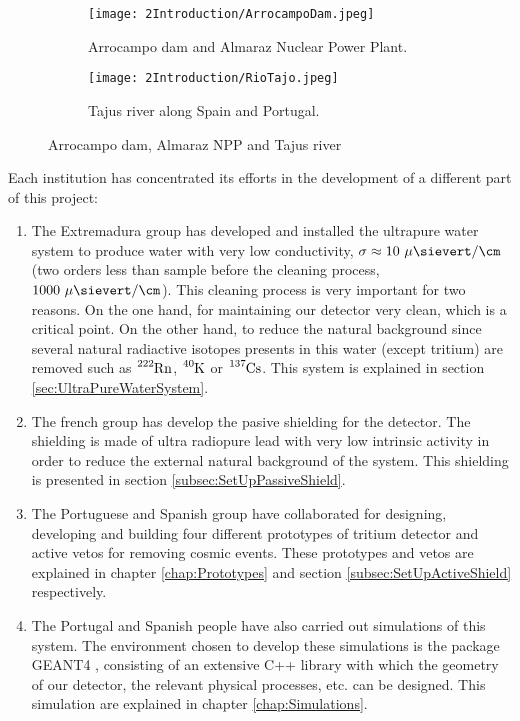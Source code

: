 \begin{figure}
\centering
    \begin{subfigure}[b]{0.45\textwidth}
    \centering
    \texttt{[image: 2Introduction/ArrocampoDam.jpeg]}  
    \caption{Arrocampo dam and Almaraz Nuclear Power Plant.\label{subfig:Arrocampo_Dam}}
    \end{subfigure}
    \hfill
    \begin{subfigure}[b]{0.45\textwidth}
    \centering
    \texttt{[image: 2Introduction/RioTajo.jpeg]}  
    \caption{Tajus river along Spain and Portugal.\label{subfig:TajusRiver}}
    \end{subfigure}
 \caption{Arrocampo dam, Almaraz NPP and Tajus river}
 \label{fig:Arrocampo}
\end{figure}

Each institution has concentrated its efforts in the development of a different part of this project:

\begin{enumerate}
\item{} The Extremadura group has developed and installed the ultrapure water system to produce water with very low conductivity, $\sigma \approx 10~\mu\sievert/\cm$ (two orders less than sample before the cleaning process, $1000~\mu\sievert/\cm$). This cleaning process is very important for two reasons. On the one hand, for maintaining our detector very clean, which is a critical point. On the other hand, to reduce the natural background since several natural radiactive isotopes presents in this water (except tritium) are removed such as $\ce{^{222}Rn}$, $\ce{^{40}K}$ or $\ce{^{137}Cs}$. This system is explained in section \ref{sec:UltraPureWaterSystem}.

\item{} The french group has develop the pasive shielding for the detector. The shielding is made of ultra radiopure lead with very low intrinsic activity in order to reduce the external natural background of the system. This shielding is presented in section \ref{subsec:SetUpPassiveShield}.

\item{} The Portuguese and Spanish group have collaborated for designing, developing and building four different prototypes of tritium detector and active vetos for removing cosmic events. These prototypes and vetos are explained in chapter \ref{chap:Prototypes} and section \ref{subsec:SetUpActiveShield} respectively.

\item{} The Portugal and Spanish people have also carried out simulations of this system. The environment chosen to develop these simulations is the package GEANT4 \cite{Geant4WebPage}, consisting of an extensive C++ library with which the geometry of our detector, the relevant physical processes, etc. can be designed. This simulation are explained in chapter \ref{chap:Simulations}.

\end{enumerate}

